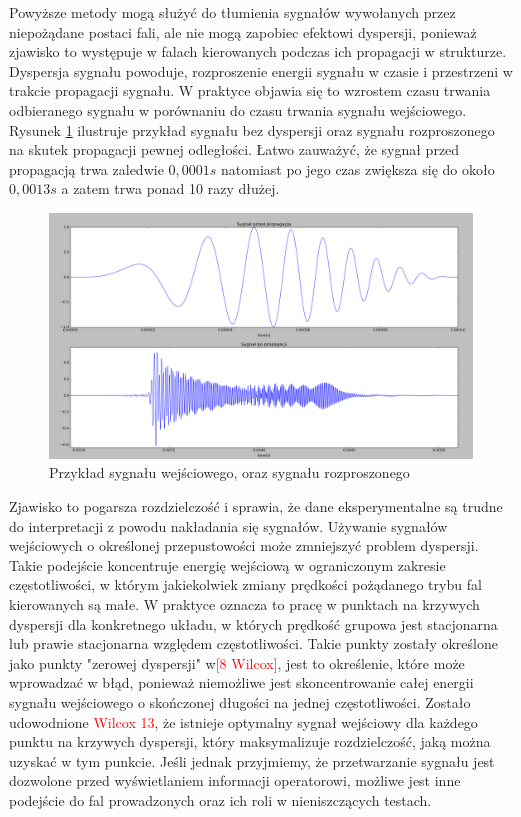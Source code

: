 Powyższe metody mogą służyć do tłumienia sygnałów wywołanych przez niepożądane postaci fali, ale nie mogą zapobiec efektowi dyspersji, ponieważ zjawisko to występuje w falach kierowanych podczas ich propagacji w strukturze. Dyspersja sygnału powoduje, rozproszenie energii sygnału w czasie i przestrzeni w trakcie propagacji sygnału. W praktyce objawia się to wzrostem czasu trwania odbieranego sygnału w porównaniu do czasu trwania sygnału wejściowego. Rysunek \ref{fig:dyspersja} ilustruje przykład sygnału bez dyspersji oraz sygnału rozproszonego na skutek propagacji pewnej odległości. Łatwo zauważyć, że sygnał przed propagacją trwa zaledwie $0,0001 s$ natomiast po jego czas zwiększa się do około $0,0013s$ a zatem trwa ponad 10 razy dłużej.
\begin{figure}[h]
\centering
\includegraphics[width=14cm]{Zdjecia/4/dyspersja}
\caption{Przykład sygnału wejściowego, oraz sygnału rozproszonego}
\label{fig:dyspersja}
\end{figure}

 Zjawisko to pogarsza rozdzielczość i sprawia, że dane eksperymentalne są trudne do interpretacji z powodu nakładania się sygnałów. Używanie sygnałów wejściowych o określonej przepustowości może zmniejszyć problem dyspersji. Takie podejście koncentruje energię wejściową w ograniczonym zakresie częstotliwości, w którym jakiekolwiek zmiany prędkości pożądanego trybu fal kierowanych są małe. W praktyce oznacza to pracę w punktach na krzywych dyspersji dla konkretnego układu, w których prędkość grupowa jest stacjonarna lub prawie stacjonarna względem częstotliwości. Takie punkty zostały określone jako punkty "zerowej dyspersji" w\textcolor{red}{[8 Wilcox]}, jest to określenie, które może wprowadzać w błąd, ponieważ niemożliwe jest skoncentrowanie całej energii sygnału wejściowego o skończonej długości na jednej częstotliwości. Zostało udowodnione \textcolor{red}{Wilcox 13}, że istnieje optymalny sygnał wejściowy dla każdego punktu na krzywych dyspersji, który maksymalizuje rozdzielczość, jaką można uzyskać w tym punkcie. Jeśli jednak przyjmiemy, że przetwarzanie sygnału jest dozwolone przed wyświetlaniem informacji operatorowi, możliwe jest inne podejście do fal prowadzonych oraz ich roli w nieniszczących testach.

